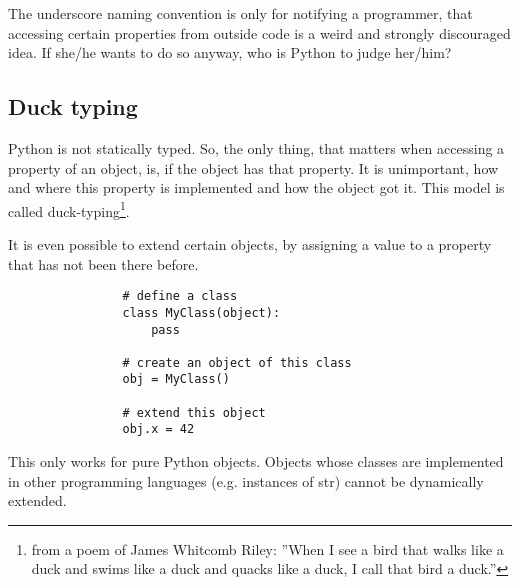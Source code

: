 			The underscore naming convention is only for notifying a programmer, that accessing certain properties from outside code is a weird and strongly discouraged idea.
			If she/he wants to do so anyway, who is Python to judge her/him?

		\subsection{Duck typing}
			\label{DuckTyping}
			Python is not statically typed.
			So, the only thing, that matters when accessing a property of an object, is, if the object has that property.
			It is unimportant, how and where this property is implemented and how the object got it.
			This model is called duck-typing\footnote{from a poem of James Whitcomb Riley: ''When I see a bird that walks like a duck and swims like a duck and quacks like a duck, I call that bird a duck.''}.

			It is even possible to extend certain objects, by assigning a value to a property that has not been there before.
			\begin{verbatim}
				# define a class
				class MyClass(object):
					pass

				# create an object of this class
				obj = MyClass()

				# extend this object
				obj.x = 42
			\end{verbatim}
			This only works for pure Python objects.
			Objects whose classes are implemented in other programming languages (e.g. instances of {\normalfont \ttfamily str}) cannot be dynamically extended.


